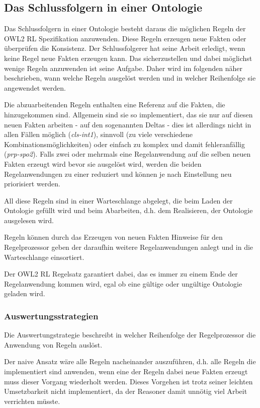 \subsection{Das Schlussfolgern in einer Ontologie}
Das Schlussfolgern in einer Ontologie besteht daraus die möglichen Regeln der OWL2 RL Spezifikation anzuwenden. Diese Regeln erzeugen neue Fakten oder überprüfen die Konsistenz. Der Schlussfolgerer hat seine Arbeit erledigt, wenn keine Regel neue Fakten erzeugen kann. Das sicherzustellen und dabei möglichst wenige Regeln anzuwenden ist seine Aufgabe. Daher wird im folgenden näher beschrieben, wann welche Regeln ausgelöst werden und in welcher Reihenfolge sie angewendet werden.

Die abzuarbeitenden Regeln enthalten eine Referenz auf die Fakten, die hinzugekommen sind. Allgemein sind sie so implementiert, das sie nur auf diesen neuen Fakten arbeiten -  auf den sogenannten Deltas - dies ist allerdings nicht in allen Fällen möglich (\emph{cls-int1}), sinnvoll (zu viele verschiedene Kombinationsmöglichkeiten) oder einfach zu komplex und damit fehleranfällig (\emph{prp-spo2}). Falls zwei oder mehrmals eine Regelanwendung auf die selben neuen Fakten erzeugt wird bevor sie ausgelöst wird, werden die beiden Regelanwendungen zu einer reduziert und können je nach Einstellung neu priorisiert werden.

All diese Regeln sind in einer Warteschlange abgelegt, die beim Laden der Ontologie gefüllt wird und beim Abarbeiten, d.h. dem Realisieren, der Ontologie ausgelesen wird.

Regeln können durch das Erzeugen von neuen Fakten Hinweise für den Regelprozessor geben der daraufhin weitere Regelanwendungen anlegt und in die Warteschlange einsortiert.

Der OWL2 RL Regelsatz garantiert dabei, das es immer zu einem Ende der Regelanwendung kommen wird, egal ob eine gültige oder ungültige Ontologie geladen wird.

\subsubsection{Auswertungsstrategien}
Die Auswertungstrategie beschreibt in welcher Reihenfolge der Regelprozessor die Anwendung von Regeln auslöst. 

Der naive Ansatz wäre alle Regeln nacheinander auszuführen, d.h. alle Regeln die implementiert sind anwenden, wenn eine der Regeln dabei neue Fakten erzeugt muss dieser Vorgang wiederholt werden. Dieses Vorgehen ist trotz seiner leichten Umsetzbarkeit nicht implementiert, da der Reasoner damit unnötig viel Arbeit verrichten müsste.

